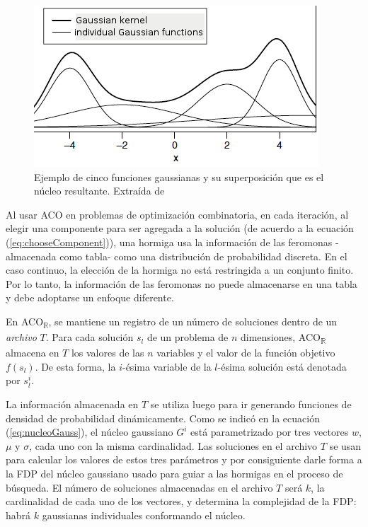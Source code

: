 \documentclass{llncs}
\begin{document}
	\begin{figure}[H]
		\centering
		\includegraphics[scale=0.5]{gaussianKernel.png}
		\caption{Ejemplo de cinco funciones gaussianas y su superposición que es el núcleo resultante. Extraída de \cite{soc:dor}}
		\label{fig:gaussianKernel}
	\end{figure}

	Al usar ACO en problemas de optimización combinatoria, en cada iteración, al elegir una componente para ser agregada
	a la solución (de acuerdo a la ecuación (\ref{eq:chooseComponent})), una hormiga usa la información de las feromonas
	-almacenada como tabla- como una distribución de probabilidad discreta. En el caso continuo, la elección de la hormiga
	no está restringida a un conjunto finito. Por lo tanto, la información de las feromonas no puede almacenarse en una tabla
	y debe adoptarse un enfoque diferente.
	
	En ACO\textsubscript{$\mathbb{R}$}, se mantiene un registro de un número de soluciones dentro de un \textit{archivo} $T$. Para cada solución
	$s_l$ de un problema de $n$ dimensiones, ACO\textsubscript{$\mathbb{R}$} almacena en $T$ los valores de las $n$ variables y el valor de la
	función objetivo $f(s_l)$. De esta forma, la $i$-ésima variable de la $l$-ésima solución está denotada por $s_l^i$.
	
	La información almacenada en $T$ se utiliza luego para ir generando funciones de densidad de probabilidad dinámicamente. Como se
	indicó en la ecuación (\ref{eq:nucleoGauss}), el núcleo gaussiano $G^i$ está parametrizado por tres vectores $w$, $\mu$ y $\sigma$,
	cada uno con la misma cardinalidad. Las soluciones en el archivo $T$ se usan para calcular los valores de estos 
	tres parámetros y por consiguiente darle forma a la FDP del núcleo gaussiano usado para guiar a las hormigas en el proceso de búsqueda. El número de 	soluciones almacenadas en el archivo $T$ será $k$, la cardinalidad de cada uno de los vectores, y determina
	la complejidad de la FDP: habrá $k$ gaussianas individuales conformando el núcleo.
	
\end{document}
